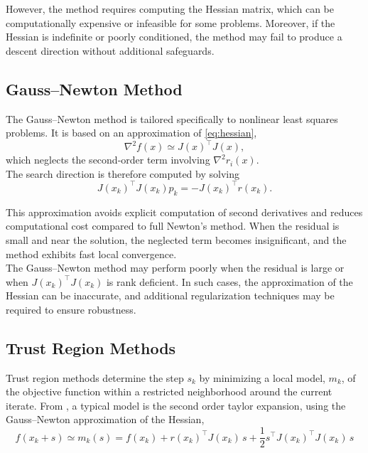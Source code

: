 However, the method requires computing the Hessian matrix, which can be computationally expensive or infeasible for some problems. Moreover, if the Hessian is indefinite or poorly conditioned, the method may fail to produce a descent direction without additional safeguards.

\subsection{Gauss--Newton Method}

The Gauss--Newton method \cite{madsen2004} is tailored specifically to nonlinear least squares problems. 
It is based on an approximation of \cref{eq:hessian},
\begin{equation*}
    \nabla^2 f(x) \simeq J(x)^\top J(x),
\end{equation*}
which neglects the second-order term involving $\nabla^2 r_i(x)$.\\

The search direction is therefore computed by solving
\begin{equation}
\label{eq:gauss_newton}
    J(x_k)^\top J(x_k) p_k = - J(x_k)^\top r(x_k).
\end{equation}

This approximation avoids explicit computation of second derivatives and reduces computational cost compared to full Newton's method. When the residual is small and near the solution, the neglected term becomes insignificant, and the method exhibits fast local convergence.\\

The Gauss--Newton method may perform poorly when the residual is large or when $J(x_k)^\top J(x_k)$ is rank deficient. In such cases, the approximation of the Hessian can be inaccurate, and additional regularization techniques may be required to ensure robustness.

\subsection{Trust Region Methods}
\label{sec:trust_region_methods}

Trust region methods determine the step $s_k$ by minimizing a local model, $m_k$, of the objective function within a restricted neighborhood around the current iterate. From \cite{madsen2004}, a typical model is the second order taylor expansion, using the Gauss--Newton approximation of the Hessian, 
\begin{equation}
\label{eq:mk}
f(x_k+s) \simeq m_k(s) = f(x_k) + r(x_k)^\top J(x_k) \, s + \frac{1}{2} s^\top J(x_k)^\top J(x_k) \, s
\end{equation}

